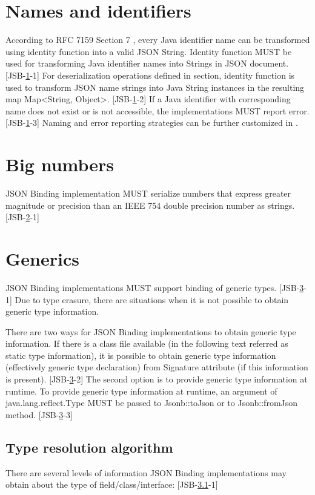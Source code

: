 \section{Names and identifiers}
\label{sec:naming}
According to RFC 7159 Section 7 \cite{rfc7159}, every Java identifier name can be transformed using identity function into a valid JSON String. Identity function MUST be used for transforming Java identifier names into Strings in JSON document. [JSB-\ref{sec:naming}-1]
For deserialization operations defined in  section, identity function is used to transform JSON name strings into Java String instances in the resulting map Map\textless String, Object\textgreater. [JSB-\ref{sec:naming}-2] If a Java identifier with corresponding name does not exist or is not accessible, the implementations MUST report error. [JSB-\ref{sec:naming}-3] Naming and error reporting strategies can be further customized in .

\section{Big numbers}
\label{sec:big_numbers}
JSON Binding implementation MUST serialize numbers that express greater magnitude or precision than an IEEE 754 double precision number as strings. [JSB-\ref{sec:big_numbers}-1]

\section{Generics}
\label{sec:generics}
JSON Binding implementations MUST support binding of generic types. [JSB-\ref{sec:generics}-1] Due to type erasure, there are situations when it is not possible to obtain generic type information.

There are two ways for JSON Binding implementations to obtain generic type information. If there is a class file available (in the following text referred as static type information), it is possible to obtain generic type information (effectively generic type declaration) from Signature attribute (if this information is present). [JSB-\ref{sec:generics}-2] The second option is to provide generic type information at runtime. To provide generic type information at runtime, an argument of java.lang.reflect.Type MUST be passed to Jsonb::toJson or to Jsonb::fromJson method. [JSB-\ref{sec:generics}-3]

\subsection{Type resolution algorithm}
\label{sec:type_resolution_algorithm}
There are several levels of information JSON Binding implementations may obtain about the type of field/class/interface: [JSB-\ref{sec:type_resolution_algorithm}-1]

